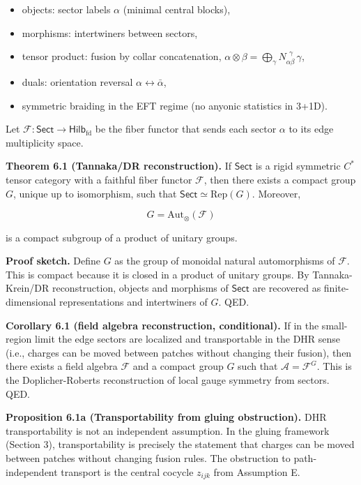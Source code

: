 \documentclass[
]{article}
\providecommand{\tightlist}{%
  \setlength{\itemsep}{0pt}\setlength{\parskip}{0pt}}
\begin{document}
\begin{itemize}
\tightlist
\item
  objects: sector labels \(\alpha\) (minimal central blocks),
\item
  morphisms: intertwiners between sectors,
\item
  tensor product: fusion by collar concatenation,
  \(\alpha \otimes \beta = \bigoplus_\gamma N_{\alpha\beta}^{\ \ \gamma}\,\gamma\),
\item
  duals: orientation reversal \(\alpha \leftrightarrow \bar\alpha\),
\item
  symmetric braiding in the EFT regime (no anyonic statistics in 3+1D).
\end{itemize}

Let \(\mathcal F: \mathsf{Sect} \to \mathsf{Hilb}_{\mathrm{fd}}\) be the
fiber functor that sends each sector \(\alpha\) to its edge multiplicity
space.

\textbf{Theorem 6.1 (Tannaka/DR reconstruction).} If \(\mathsf{Sect}\)
is a rigid symmetric \(C^*\) tensor category with a faithful fiber
functor \(\mathcal F\), then there exists a compact group \(G\), unique
up to isomorphism, such that \(\mathsf{Sect} \simeq \mathrm{Rep}(G)\).
Moreover,

\[
G = \mathrm{Aut}_\otimes(\mathcal F)
\]

is a compact subgroup of a product of unitary groups.

\textbf{Proof sketch.} Define \(G\) as the group of monoidal natural
automorphisms of \(\mathcal F\). This is compact because it is closed in
a product of unitary groups. By Tannaka-Krein/DR reconstruction, objects
and morphisms of \(\mathsf{Sect}\) are recovered as finite-dimensional
representations and intertwiners of \(G\). QED.

\textbf{Corollary 6.1 (field algebra reconstruction, conditional).} If
in the small-region limit the edge sectors are localized and
transportable in the DHR sense (i.e., charges can be moved between
patches without changing their fusion), then there exists a field
algebra \(\mathcal F\) and a compact group \(G\) such that
\(\mathcal A = \mathcal F^G\). This is the Doplicher-Roberts
reconstruction of local gauge symmetry from sectors. QED.

\textbf{Proposition 6.1a (Transportability from gluing obstruction).}
DHR transportability is not an independent assumption. In the gluing
framework (Section 3), transportability is precisely the statement that
charges can be moved between patches without changing fusion rules. The
obstruction to path-independent transport is the central cocycle
\(z_{ijk}\) from Assumption E.
\end{document}
